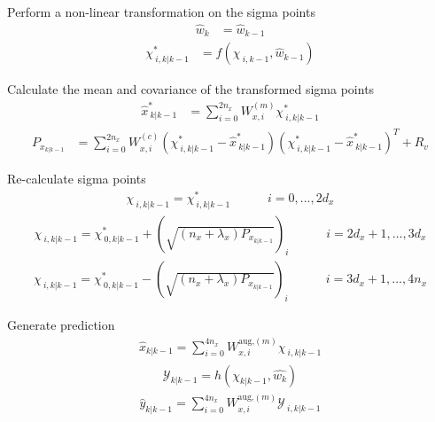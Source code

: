     \item Perform a non-linear transformation on the sigma points
    \begin{align*}
        \hat{w}_{k} &= \hat{w}_{k-1} 
        \end{align*}
        \begin{align*}
        \chi^{*}_{\ i,k|k-1} &= f(\chi_{\ i,k-1},\hat{w}_{k-1})
    \end{align*}
    \item Calculate the mean and covariance of the transformed sigma points
    \begin{align*}
        \hat{x}^{*}_{\ k|k-1} &= \sum_{i=0}^{2n_{x}} W^{(m)}_{x,i} \chi^{*}_{\ i, k|k-1} 
        \end{align*}
        \begin{align*}
        P_{x_{k|k-1}} &=  \sum_{i=0}^{2n_{x}} W^{(c)}_{x,i} (\chi^{*}_{\ i, k|k-1} - \hat{x}^{*}_{\ k|k-1})(\chi^{*}_{\ i, k|k-1} - \hat{x}^{*}_{\ k|k-1})^{T} + R_{v} %
    \end{align*}
    \item Re-calculate sigma points
    \begin{align*}
        \chi_{\ i, k|k-1} = \chi^{*}_{\ i,k|k-1} \quad \quad \quad  i=0,...,2d_{x} 
         \end{align*}
         \begin{align*}
        \chi_{\ i, k|k-1} = \chi^{*}_{\ 0,k|k-1} + (\sqrt{(n_{x}+\lambda_{x})P_{x_{k|k-1}}})_{i}  \quad \quad \quad i=2d_{x}+1,\dots,3d_{x} 
         \end{align*}
         \begin{align*}
        \chi_{\ i, k|k-1} = \chi^{*}_{\ 0,k|k-1} - (\sqrt{(n_{x}+\lambda_{x})P_{x_{k|k-1}}})_{i}  \quad \quad \quad  i=3d_{x}+1,\dots,4n_{x}
    \end{align*}
    \item Generate prediction
    \begin{align*}
        \hat{x}_{k|k-1} = \sum_{i=0}^{4n_{x}} W^{\text{aug,}(m)}_{x,i} \chi_{\ i, k|k-1} 
        \end{align*}
         \begin{align*}
        \mathcal{Y}_{k|k-1} = h(\chi_{k|k-1},\hat{w_{k}}) 
        \end{align*}
         \begin{align*}
        \hat{y}_{k|k-1} = \sum_{i=0}^{4n_{x}} W^{\text{aug,}(m)}_{x,i} \mathcal{Y}_{\ i, k|k-1}
    \end{align*}
